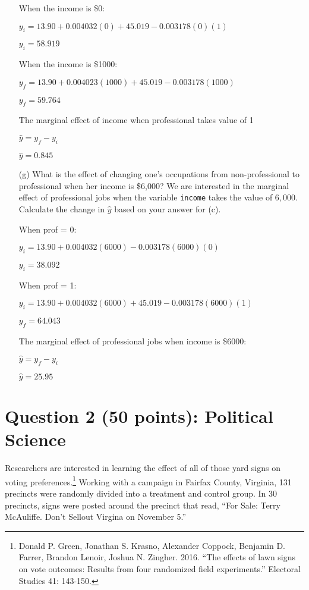 \documentclass[12pt,letterpaper]{article}
\begin{document}
\begin{enumerate}
	When the income is \$0:
	
	$y_{i} = 13.90 + 0.004032(0) + 45.019 - 0.003178(0)(1)$

	$y_{i} = 58.919$
	
	When the income is \$1000:
	
	$y_{f} = 13.90 + 0.004023(1000) + 45.019 - 0.003178(1000)$
	
	$y_{f} = 59.764$
	
	The marginal effect of income when professional takes value of 1
	
	$\hat{y} = y_{f} - y_{i}$
	
	$\hat{y} = 0.845$
	\vspace{3cm}
	
	
	\item [(g)]
	What is the effect of changing one's occupations from non-professional to professional when her income is \$6,000? We are interested in the marginal effect of professional jobs when the variable \texttt{income} takes the value of $6,000$. Calculate the change in $\hat{y}$ based on your answer for (c).
	
	When prof = 0:
	
	$y_{i} = 13.90 + 0.004032(6000) - 0.003178(6000)(0)$
	
		$y_{i} = 38.092$
		
	When prof = 1:
	
	$y_{i} = 13.90 + 0.004032(6000) + 45.019 - 0.003178(6000)(1)$
	
		$y_{f} = 64.043$
		
	The marginal effect of professional jobs when income is \$6000: 
	
	$\hat{y} = y_{f} - y_{i}$
	
	$\hat{y} = 25.95$
\end{enumerate}

\newpage

\section*{Question 2 (50 points): Political Science}
\vspace{.25cm}
\noindent 	Researchers are interested in learning the effect of all of those yard signs on voting preferences.\footnote{Donald P. Green, Jonathan	S. Krasno, Alexander Coppock, Benjamin D. Farrer,	Brandon Lenoir, Joshua N. Zingher. 2016. ``The effects of lawn signs on vote outcomes: Results from four randomized field experiments.'' Electoral Studies 41: 143-150. } Working with a campaign in Fairfax County, Virginia, 131 precincts were randomly divided into a treatment and control group. In 30 precincts, signs were posted around the precinct that read, ``For Sale: Terry McAuliffe. Don't Sellout Virgina on November 5.'' \\
\end{document}
